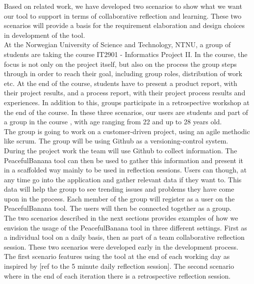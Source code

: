 Based on related work, we have developed two scenarios to show what we want our tool to support in terms of collaborative reflection and learning. These two scenarios will provide a basis for the requirement elaboration and design choices in development of the tool. 
\\
At the Norwegian University of Science and Technology, NTNU, a group of students are taking the course IT2901 - Informatics Project II\footnotemark.
In the course, the focus is not only on the project itself, but also on the process the group steps through in order to reach their goal, including group roles, distribution of work etc. At the end of the course, students have to present a product report, with their project results, and a process report, with their project process results and experiences. In addition to this, groups participate in a retrospective workshop at the end of the course. In these three scenarios, our users are students and part of a group in the course , with age ranging from 22 and up to 28 years old.
\\
The group is going to work on a customer-driven project, using an agile methodic like scrum. The group will be using Github as a versioning-control system. During the project work the team will use Github to collect information. The PeacefulBanana tool can then be used to gather this information and present it in a scaffolded way mainly to be used in reflection sessions. Users can though, at any time go into the application and gather relevant data if they want to. This data will help the group to see trending issues and problems they have come upon in the process. Each member of the group will register as a user on the PeacefulBanana tool. The users will then be connected together as a group. 
\\
The two scenarios described in the next sections provides examples of how we envision the usage of the PeacefulBanana tool in three different settings. First as a individual tool on a daily basis, then as part of a team collaborative reflection session.
These two scenarios were developed early in the development process. The first scenario features using the tool at the end of each working day as inspired by [ref to the 5 minute daily reflection session]. The second scenario where in the end of each iteration there is a retrospective reflection session. 
\\


